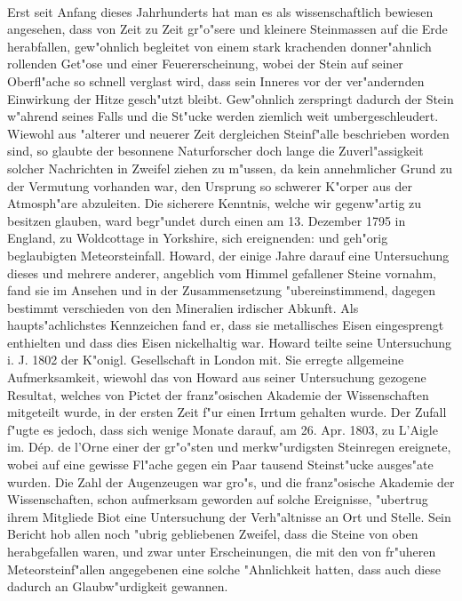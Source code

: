 \documentclass[a4paper, 11pt, oneside]{article}
\begin{document}
\paragraph{}
Erst seit Anfang dieses Jahrhunderts hat man es als wissenschaftlich bewiesen angesehen, dass von Zeit zu Zeit gr"o"sere und kleinere Steinmassen auf die Erde herabfallen, gew"ohnlich begleitet von einem stark krachenden donner"ahnlich rollenden Get"ose und einer Feuererscheinung, wobei der Stein auf seiner Oberfl"ache so schnell verglast wird, dass sein Inneres vor der ver"andernden Einwirkung der Hitze gesch"utzt bleibt. Gew"ohnlich zerspringt dadurch der Stein w"ahrend seines Falls und die St"ucke werden ziemlich weit umbergeschleudert. Wiewohl aus "alterer und neuerer Zeit dergleichen Steinf"alle beschrieben worden sind, so glaubte der besonnene Naturforscher doch lange die Zuverl"assigkeit solcher Nachrichten in Zweifel ziehen zu m"ussen, da kein annehmlicher Grund zu der Vermutung vorhanden war, den Ursprung so schwerer K"orper aus der Atmosph"are abzuleiten. Die sicherere Kenntnis, welche wir gegenw"artig zu besitzen glauben, ward begr"undet durch einen am 13. Dezember 1795 in England, zu Woldcottage in Yorkshire, sich ereignenden: und geh"orig beglaubigten Meteorsteinfall. Howard, der einige Jahre darauf eine Untersuchung dieses und mehrere anderer, angeblich vom Himmel gefallener Steine vornahm, fand sie im Ansehen und in der Zusammensetzung "ubereinstimmend, dagegen bestimmt verschieden von den Mineralien irdischer Abkunft. Als haupts"achlichstes Kennzeichen fand er, dass sie metallisches Eisen eingesprengt enthielten und dass dies Eisen nickelhaltig war. Howard teilte seine Untersuchung i. J. 1802 der K"onigl. Gesellschaft in London mit. Sie erregte allgemeine Aufmerksamkeit, wiewohl das von Howard aus seiner Untersuchung gezogene Resultat, welches von Pictet der franz"osischen Akademie der Wissenschaften mitgeteilt wurde, in der ersten Zeit f"ur einen Irrtum gehalten wurde. Der Zufall f"ugte es jedoch, dass sich wenige Monate darauf, am 26. Apr. 1803, zu L'Aigle im. Dép. de l’Orne einer der gr"o"sten und merkw"urdigsten Steinregen ereignete, wobei auf eine gewisse Fl"ache gegen ein Paar tausend Steinst"ucke ausges"ate wurden. Die Zahl der Augenzeugen war gro"s, und die franz"osische Akademie der Wissenschaften, schon aufmerksam geworden auf solche Ereignisse, "ubertrug ihrem Mitgliede Biot eine Untersuchung der Verh"altnisse an Ort und Stelle. Sein Bericht hob allen noch "ubrig gebliebenen Zweifel, dass die Steine von oben herabgefallen waren, und zwar unter Erscheinungen, die mit den von fr"uheren Meteorsteinf"allen angegebenen eine solche "Ahnlichkeit hatten, dass auch diese dadurch an Glaubw"urdigkeit gewannen.
\end{document}
